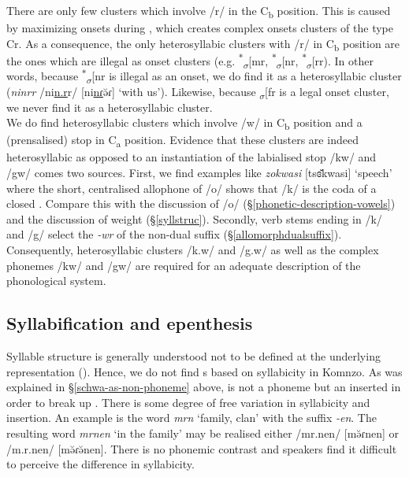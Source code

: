 There are only few clusters which involve /r/ in the C\textsubscript{b} position. This is caused by maximizing onsets during , which creates complex onsets clusters of the type Cr. As a consequence, the only heterosyllabic clusters with /r/ in C\textsubscript{b} position are the ones which are illegal as onset clusters (e.g. \textsuperscript{$\ast$}\textsubscript{$\sigma$}[mr, \textsuperscript{$\ast$}\textsubscript{$\sigma$}[nr, \textsuperscript{$\ast$}\textsubscript{$\sigma$}[rr). In other words, because \textsuperscript{$\ast$}\textsubscript{$\sigma$}[nr is illegal as an onset, we do find it as a heterosyllabic cluster (\emph{ninrr} /ni\underline{n.r}r/ [ni\underline{nɾ}ə̆ɾ] `with us'). Likewise, because \textsubscript{$\sigma$}[fr is a legal onset cluster, we never find it as a heterosyllabic cluster.\\

We do find heterosyllabic clusters which involve /w/ in C\textsubscript{b} position and a  (prensalised) stop in  C\textsubscript{a} position. Evidence that these clusters are indeed heterosyllabic as opposed to an instantiation of the labialised  stop /kw/ and /gw/ comes two sources. First, we find examples like \emph{zokwasi} [tsɞ̆kwasi] `speech' where the short, centralised allophone of /o/ shows that /k/ is the coda of a closed . Compare this with the discussion of /o/ (\S{}\ref{phonetic-description-vowels}) and the discussion of  weight (\S{}\ref{syllstruc}). Secondly, verb stems ending in /k/ and /g/ select the \emph{-wr}  of the non-dual suffix (\S{}\ref{allomorphdualsuffix}). Consequently, heterosyllabic clusters /k.w/ and /g.w/ as well as the complex phonemes /kw/ and /gw/ are required for an adequate description of the phonological system.
\vspace{.2cm}
\subsection{Syllabification and epenthesis} \label{syllabificationandepenthesis}
\vspace{.2cm}
Syllable structure is generally understood not to be defined at the underlying representation (\citealt[221]{Blevins:1995tt}). Hence, we do not find s based on syllabicity in Komnzo. As was explained in \S{}\ref{schwa-as-non-phoneme} above,  is not a phoneme but an  inserted in order to break up . There is some degree of free variation in syllabicity and  insertion. An example is the word \emph{mrn} `family, clan' with the  suffix \emph{-en}. The resulting word \emph{mrnen} `in the family' may be realised either /mr.nen/ [mə̆ɾnen] or /m.r.nen/ [mə̆ɾə̆nen]. There is no phonemic contrast and speakers find it difficult to perceive the difference in syllabicity.\\

